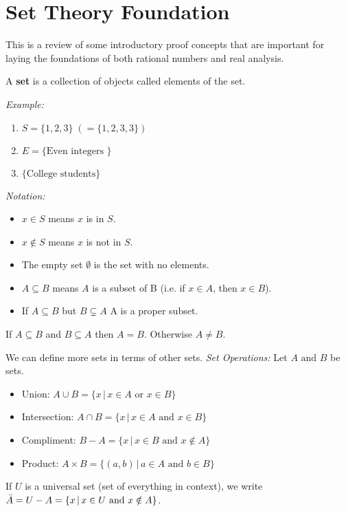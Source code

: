 \documentclass[../main.tex]{subfiles}
\begin{document}
\section{Set Theory Foundation}

This is a review of some introductory proof concepts that are important for laying the foundations of both
rational numbers and real analysis.

\begin{definition}[]
    A \textbf{set} is a collection of objects called elements of the set.
\end{definition}

\textit{Example:}
\begin{enumerate}
    \item \( S = \{ 1, 2, 3 \} \; (= \{ 1,2,3,3 \}) \)
    \item \( E = \{ \text{Even integers } \} \)
    \item \( \{ \text{College students} \} \)
\end{enumerate}

\textit{Notation:}
\begin{itemize}
    \item \( x \in S \) means \( x \) is in \( S \).
    \item \( x \notin S \) means \( x \) is not in \( S \).
    \item The empty set \( \emptyset \) is the set with no elements.
    \item \( A \subseteq B \) means \( A \) is a subset of B (i.e. if \( x \in A \), then \( x \in B \)).
    \item If \( A \subseteq B \) but \( B \subsetneq A \) A is a proper subset.
\end{itemize}

If \( A \subseteq B \) and \( B \subseteq A \) then \( A = B \). Otherwise \( A \neq B \).

We can define more sets in terms of other sets.
\textit{Set Operations:}
Let \( A \text{ and } B \) be sets.
\begin{itemize}
    \item Union: \( A \cup B  = \{ x \, | \, x \in A \text{ or } x \in B \}\)
    \item Intersection: \( A \cap B  = \{ x \, | \, x \in A \text{ and } x \in B \}\)
    \item Compliment: \( B - A = \{ x \, | \, x \in B \text{ and } x \notin A \} \)
    \item Product: \( A \times B = \{ (a, b) \, | \, a \in A \text{ and } b \in B \} \)
\end{itemize}

If \( U \) is a universal set (set of everything in context), we write
\( \bar{A} = U - A \\ = \{ x \, | \, x \in U \text{ and } x \notin A \} \).
\end{document}
